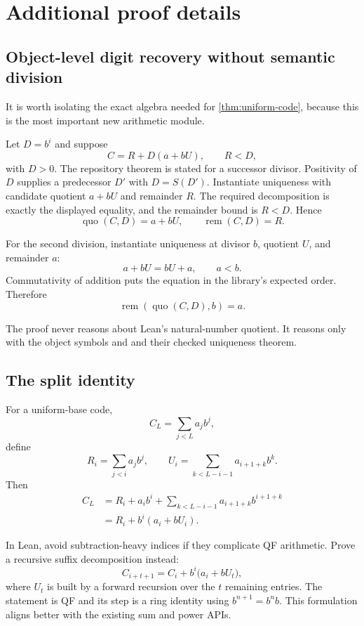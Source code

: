 \section{Additional proof details}

\subsection{Object-level digit recovery without semantic division}

It is worth isolating the exact algebra needed for
\cref{thm:uniform-code}, because this is the most important new arithmetic
module.

Let \(D=b^i\) and suppose
\[
 C=R+D(a+bU),\qquad R<D,
\]
with \(D>0\).  The repository theorem  is stated for
a successor divisor.  Positivity of \(D\) supplies a predecessor \(D'\) with
\(D=S(D')\).  Instantiate uniqueness with candidate quotient \(a+bU\) and
remainder \(R\).  The required decomposition is exactly the displayed
equality, and the remainder bound is \(R<D\).  Hence
\[
  \operatorname{quo}(C,D)=a+bU,
  \qquad
  \operatorname{rem}(C,D)=R.
\]

For the second division, instantiate uniqueness at divisor \(b\), quotient
\(U\), and remainder \(a\):
\[
  a+bU=bU+a,
  \qquad a<b.
\]
Commutativity of addition puts the equation in the library's expected order.
Therefore
\[
 \operatorname{rem}(\operatorname{quo}(C,D),b)=a.
\]

The proof never reasons about Lean's natural-number quotient.  It reasons only
with the object symbols  and  and their checked
uniqueness theorem.

\subsection{The split identity}

For a uniform-base code,
\[
 C_L=\sum_{j<L}a_jb^j,
\]
define
\[
 R_i=\sum_{j<i}a_jb^j,
 \qquad
 U_i=\sum_{k<L-i-1}a_{i+1+k}b^k.
\]
Then
\[
 \begin{split}
 C_L
 &=R_i+a_ib^i+
   \sum_{k<L-i-1}a_{i+1+k}b^{i+1+k}\\
 &=R_i+b^i\left(a_i+bU_i\right).
 \end{split}
\]

In Lean, avoid subtraction-heavy indices if they complicate QF arithmetic.
Prove a recursive suffix decomposition instead:
\[
 C_{i+t+1}=C_i+b^i\bigl(a_i+bU_t\bigr),
\]
where \(U_t\) is built by a forward recursion over the \(t\) remaining
entries.  The statement is QF and its step is a ring identity using
\(b^{n+1}=b^n b\).  This formulation aligns better with the existing sum and
power APIs.

